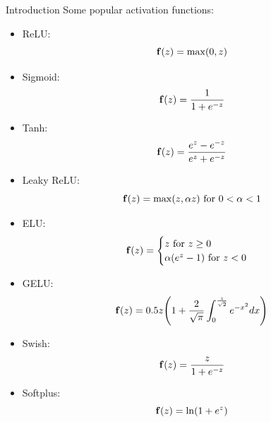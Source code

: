 \documentclass[10pt]{beamer}
\theoremstyle{remark}
\theoremstyle{definition}
\begin{document}
\begin{frame}[allowframebreaks]{Introduction}
	Some popular activation functions:

	\begin{itemize}
		\item ReLU:
		\begin{equation*}
			\bold{f}(z) = \max(0, z)
		\end{equation*}
		\item Sigmoid:
		\begin{equation*}
			\bold{f}(z) = \dfrac{1}{1 + e^{-z}}
		\end{equation*}
		\item Tanh:
		\begin{equation*}
			\bold{f}(z) = \dfrac{e^z - e^{-z}}{e^z + e^{-z}}
		\end{equation*}
		\item Leaky ReLU:
		\begin{equation*}
			\bold{f}(z)=\max(z, \alpha z) \text{ for } 0 < \alpha < 1
		\end{equation*}
		\item ELU:
		\begin{equation*}
			\bold{f}(z) = \begin{cases} z \text{ for } z \geq 0 \\ \alpha (e^z - 1) \text{ for } z < 0 \end{cases}
		\end{equation*}
		\item GELU:
		\begin{equation*}
			\bold{f}(z)=0.5 z \Bigg( 1 + \dfrac{2}{\sqrt{\pi}} \int_0^{\frac{z}{\sqrt{2}}} e^{-x^2}dx \Bigg)
		\end{equation*}
		\item Swish:
		\begin{equation*}
			\bold{f}(z) = \dfrac{z}{1 + e^{-z}}
		\end{equation*}
		\item Softplus:
		\begin{equation*}
			\bold{f}(z) = \ln(1 + e^z)
		\end{equation*}
	\end{itemize}


\end{frame}
\end{document}
